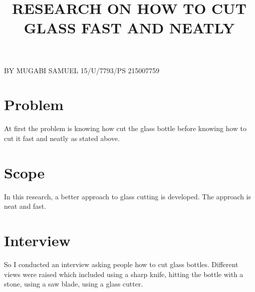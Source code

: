 \documentclass[12pt]{article}
\begin{document}
\title{RESEARCH ON HOW TO CUT GLASS FAST AND NEATLY\\}
\maketitle
BY MUGABI SAMUEL 15/U/7793/PS 215007759
\section{Problem}
At first the problem is knowing how cut the glass bottle before knowing how to cut it fast and neatly as stated above. 
\section{Scope}
In this research, a better approach to glass cutting is developed. The approach is neat and fast.
\section{Interview}
So I conducted an interview asking people how to cut glass bottles. Different views were raised which included using a sharp knife, hitting the bottle with a stone, using a saw blade, using a glass cutter.
\end{document}
